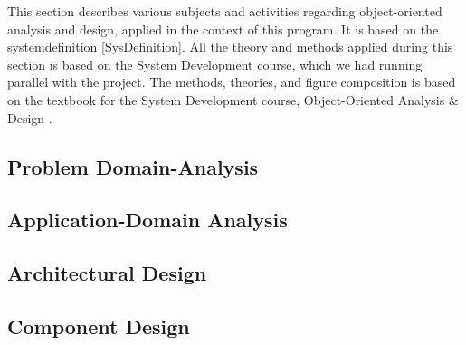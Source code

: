 This section describes various subjects and activities regarding object-oriented analysis and design, applied in the context of this program. It is based on the systemdefinition \ref{SysDefinition}. All the theory and methods applied during this section is based on the System Development course, which we had running parallel with the project. The methods, theories, and figure composition is based on the textbook for the System Development course, Object-Oriented Analysis \& Design \cite{ObjektAnalyseDesign}.

\subsection{Problem Domain-Analysis}
\label{ProblemDomain}

\subsection{Application-Domain Analysis}
\label{ApplicationDomain}

\subsection{Architectural Design}
\label{ArchDes}

\subsection{Component Design}
\label{ComponentDesign}
